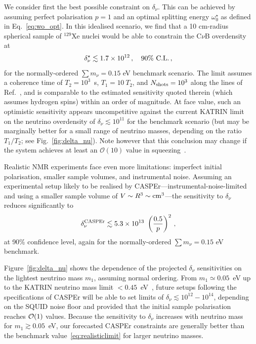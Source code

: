 \documentclass[aps,prd,10pt,twocolumn,superscriptaddress,floatfix,nofootinbib,amsmath,amssymb,altaffilletter,preprintnumbers]{revtex4-1}
\begin{document}
We consider first the best possible constraint on $\delta_\nu$.  This can be achieved by assuming perfect polarisation $p=1$ and an optimal splitting energy $\omega^\star_0$ as defined in Eq.~\eqref{eq:wo_opt}.  In this idealised scenario, we find that a 10 cm-radius spherical sample of $^{129}$Xe nuclei would be able to constrain the C$\nu$B overdensity at 
\begin{equation}
\delta^{\star}_{\nu}\lesssim 1.7 \times 10^{12}\,, \quad 90\%~{\rm C.L.}\, , 
\label{eq:delta_best}
\end{equation}
for the normally-ordered $\sum m_\nu=0.15$ eV benchmark scenario. The limit assumes a coherence time of $T_2=10^3$~s, $T_1 = 10~T_2$, and $N_{\rm shots}=10^3$ along the lines of Ref.~\cite{Arvanitaki:2024taq}, and is comparable to the estimated sensitivity quoted therein (which assumes hydrogen spins) within an order of magnitude. At face value, such an optimistic sensitivity appears uncompetitive against the current KATRIN limit on the neutrino overdensity of $\delta_\nu \lesssim 10^{11}$ for the benchmark scenario (but may  be marginally better for a small range of neutrino masses, depending on the ratio $T_1/T_2$; see Fig.~\ref{fig:delta_nu}). Note however that this conclusion may  change if the system achieves at least an $\mathcal{O}(10)$ value in squeezing~\cite{Galanis:2025amc}.

Realistic NMR experiments face even more limitations: imperfect initial polarisation, smaller sample volumes, and instrumental noise. 
Assuming an experimental setup likely to be realised by CASPEr---instrumental-noise-limited and using a smaller sample volume of $V\sim R^3 \sim {\rm cm}^{3}$---the sensitivity to $\delta_\nu$ reduces significantly to 
\begin{equation}
    \delta_{\nu}^{\rm CASPEr}\lesssim 5.3\times 10^{13}~\left(\frac{0.5}{p}\right)^2\, ,
    \label{eq:realisticlimit}
\end{equation}
at 90\% confidence level, again for the normally-ordered $\sum m_\nu=0.15$ eV benchmark.



Figure~\ref{fig:delta_nu} shows the dependence of the projected $\delta_\nu$ sensitivities on the lightest neutrino mass $m_1$, assuming normal ordering. From $m_1 \simeq 0.05$~eV up to the KATRIN neutrino mass limit $<0.45$~eV~\cite{KATRIN:2024cdt}, future setups following the specifications of CASPEr will be able to set limits of $\delta_\nu \lesssim 10^{12}-10^{14}$,  depending on the SQUID noise floor and provided that the initial sample polarisation reaches ${\cal O}(1)$ values. Because the sensitivity to $\delta_\nu$ increases with neutrino mass for $m_1 \gtrsim 0.05$~eV, our forecasted CASPEr constraints are generally better than the benchmark value~\eqref{eq:realisticlimit} for larger neutrino masses.
\end{document}
